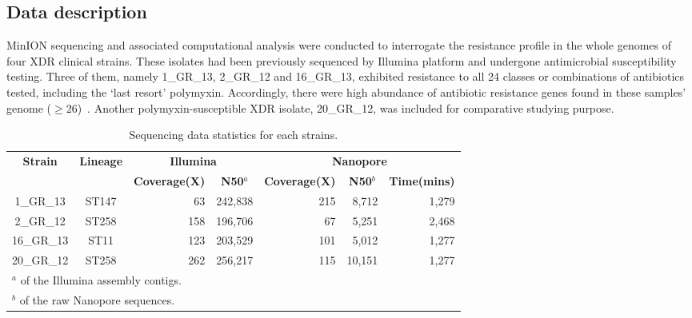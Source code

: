 \subsection{Data description}
MinION sequencing and associated computational analysis were conducted to interrogate the resistance profile in the whole genomes of four XDR clinical \kp{} strains. These isolates had been previously sequenced by Illumina platform and undergone antimicrobial susceptibility testing.
Three of them, namely 1\_GR\_13, 2\_GR\_12 and 16\_GR\_13, exhibited resistance to all 24 classes or combinations of antibiotics tested, including the `last resort' polymyxin. Accordingly, there were high abundance of antibiotic resistance genes found in these samples' genome ($\geq 26$)~\cite{Miranda2018}. 
Another polymyxin-susceptible XDR isolate, 20\_GR\_12, was included for comparative studying purpose.
\begin{table}[!hpt]
\centering
\caption{Sequencing data statistics for each \kp{} strains.}
\label{tab:assers_stats}
\begin{tabular}{|c|c|r|r|r|r|r|}
\hline
\multirow{2}{*}{\textbf{Strain}} & \multirow{2}{*}{\textbf{Lineage}} & \multicolumn{2}{c|}{\textbf{Illumina}}                                     & \multicolumn{3}{c|}{\textbf{Nanopore}}                                                            \\ \cline{3-7} 
                                 &                                   & \multicolumn{1}{c|}{\textbf{Coverage(X)}} & \multicolumn{1}{c|}{\textbf{N50$^a$}} & \multicolumn{1}{c|}{\textbf{Coverage(X)}} & \multicolumn{1}{c|}{\textbf{N50$^b$}} & \textbf{Time(mins)} \\ \hline
1\_GR\_13                        & ST147                             & 63                                     & 242,838                           & 215                                    & 8,712                             & 1,279                \\ \hline
2\_GR\_12                        & ST258                             & 158                                    & 196,706                           & 67                                     & 5,251                             & 2,468                \\ \hline
16\_GR\_13                       & ST11                              & 123                                    & 203,529                           & 101                                    & 5,012                             & 1,277                \\ \hline
20\_GR\_12                       & ST258                             & 262                                    & 256,217                           & 115                                    & 10,151                            & 1,277                \\ \hline

\multicolumn{7}{l}{\small{$^a$ of the Illumina assembly contigs.}}\\
\multicolumn{7}{l}{\small{$^b$ of the raw Nanopore sequences.}}
\end{tabular}
\end{table}

